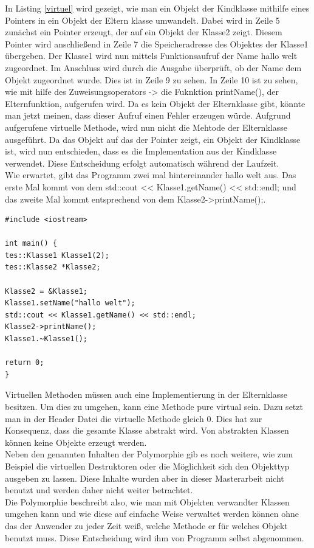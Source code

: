In Listing \ref{virtuel} wird gezeigt, wie man ein Objekt der Kindklasse mithilfe eines Pointers in ein Objekt der Eltern klasse umwandelt. Dabei wird in Zeile 5  zunächst ein Pointer erzeugt, der auf ein Objekt der Klasse2 zeigt. Diesem Pointer wird anschließend in Zeile 7 die Speicheradresse des Objektes der Klasse1 übergeben. Der Klasse1 wird nun mittels Funktionsaufruf der Name  \glqq hallo welt\grqq{} zugeordnet. Im Anschluss wird durch die Ausgabe überprüft, ob der Name dem Objekt zugeordnet wurde. Dies ist in Zeile 9 zu sehen. In Zeile 10 ist zu sehen, wie mit hilfe des Zuweisungsoperators \glqq ->\grqq{} die Fuknktion \glqq printName()\grqq{}, der Elternfunktion, aufgerufen wird. Da es kein Objekt der Elternklasse gibt, könnte man jetzt meinen, dass dieser Aufruf einen Fehler erzeugen würde. Aufgrund aufgerufene virtuelle Methode, wird nun nicht die Mehtode der Elternklasse ausgeführt. Da das Objekt auf das der Pointer zeigt, ein Objekt der Kindklasse ist, wird nun entschieden, dass es die Implementation aus der Kindklasse verwendet. Diese Entscheidung erfolgt automatisch während der Laufzeit. \\
Wie erwartet, gibt das Programm zwei mal hintereinander \glqq hallo welt\grqq{} aus. Das erste Mal kommt von dem \glqq std::cout << Klasse1.getName() << std::endl;\grqq{} und das zweite Mal kommt entsprechend von dem \glqq Klasse2->printName();\grqq{}.
\begin{lstlisting}[caption = Beispiel virtuelle Funktion,label=virtuel]
#include <iostream>

int main() {
tes::Klasse1 Klasse1(2);
tes::Klasse2 *Klasse2;

Klasse2 = &Klasse1;
Klasse1.setName("hallo welt");
std::cout << Klasse1.getName() << std::endl;
Klasse2->printName();
Klasse1.~Klasse1();

return 0;
}
\end{lstlisting}
Virtuellen Methoden müssen  auch eine Implementierung in der Elternklasse besitzen. Um dies zu umgehen, kann eine Methode \glqq pure virtual\grqq{} sein. Dazu setzt man in der Header Datei die virtuelle Methode gleich 0. Dies hat zur Konsequenz, dass die gesamte Klasse abstrakt wird. Von abstrakten Klassen können keine Objekte erzeugt werden. 
\\
Neben den genannten Inhalten der Polymorphie gib es noch weitere, wie zum Beispiel die virtuellen Destruktoren oder die Möglichkeit sich den Objekttyp ausgeben zu lassen. Diese Inhalte wurden aber in dieser Masterarbeit nicht benutzt und werden daher nicht weiter betrachtet.
\\
Die Polymorphie beschreibt also, wie man mit Objekten verwandter Klassen umgehen kann und wie diese auf einfache Weise verwaltet werden können ohne das der Anwender zu jeder Zeit weiß, welche Methode er für welches Objekt benutzt muss. Diese Entscheidung wird ihm von Programm selbst abgenommen. 
\\
\cite{HelmutErlenkotter.}
\cite{Prof.Dr.AlfredIrber.}
\cite{Krau.}

